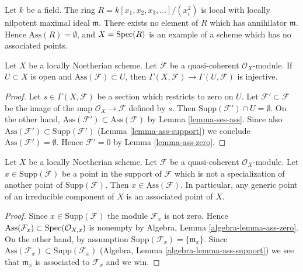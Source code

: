 \begin{example}
\label{example-no-associated-prime}
Let $k$ be a field. The ring $R = k[x_1, x_2, x_3, \ldots]/(x_i^2)$
is local with locally nilpotent maximal ideal $\mathfrak m$.
There exists no element of $R$ which has annihilator $\mathfrak m$.
Hence $\text{Ass}(R) = \emptyset$, and $X = \mathop{\mathrm{Spec}}(R)$
is an example of a scheme which has no associated points.
\end{example}

\begin{lemma}
\label{lemma-restriction-injective-open-contains-ass}
Let $X$ be a locally Noetherian scheme. Let $\mathcal{F}$ be a quasi-coherent
$\mathcal{O}_X$-module. If $U \subset X$ is open and
$\text{Ass}(\mathcal{F}) \subset U$, then
$\Gamma(X, \mathcal{F}) \to \Gamma(U, \mathcal{F})$ is injective.
\end{lemma}

\begin{proof}
Let $s \in \Gamma(X, \mathcal{F})$ be a section which restricts to zero on $U$.
Let $\mathcal{F}' \subset \mathcal{F}$ be the image of the map
$\mathcal{O}_X \to \mathcal{F}$ defined by $s$. Then
$\text{Supp}(\mathcal{F}') \cap U = \emptyset$. On the other hand,
$\text{Ass}(\mathcal{F}') \subset \text{Ass}(\mathcal{F})$
by Lemma \ref{lemma-ses-ass}. Since also
$\text{Ass}(\mathcal{F}') \subset \text{Supp}(\mathcal{F}')$
(Lemma \ref{lemma-ass-support}) we conclude
$\text{Ass}(\mathcal{F}') = \emptyset$.
Hence $\mathcal{F}' = 0$ by Lemma \ref{lemma-ass-zero}.
\end{proof}

\begin{lemma}
\label{lemma-minimal-support-in-ass}
Let $X$ be a locally Noetherian scheme.
Let $\mathcal{F}$ be a quasi-coherent $\mathcal{O}_X$-module.
Let $x \in \text{Supp}(\mathcal{F})$ be a point in the support
of $\mathcal{F}$ which is not a specialization of another point of
$\text{Supp}(\mathcal{F})$. Then $x \in \text{Ass}(\mathcal{F})$.
In particular, any generic point of an irreducible component of $X$
is an associated point of $X$.
\end{lemma}

\begin{proof}
Since $x \in \text{Supp}(\mathcal{F})$ the module $\mathcal{F}_x$
is not zero. Hence
$\text{Ass}(\mathcal{F}_x) \subset \mathop{\mathrm{Spec}}(\mathcal{O}_{X, x})$
is nonempty by
Algebra, Lemma \ref{algebra-lemma-ass-zero}.
On the other hand, by assumption
$\text{Supp}(\mathcal{F}_x) = \{\mathfrak m_x\}$.
Since
$\text{Ass}(\mathcal{F}_x) \subset \text{Supp}(\mathcal{F}_x)$
(Algebra, Lemma \ref{algebra-lemma-ass-support})
we see that $\mathfrak m_x$ is associated to $\mathcal{F}_x$
and we win.
\end{proof}

